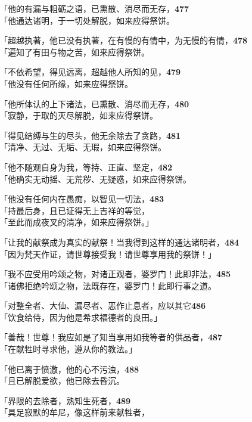 「他的有漏与粗砺之语，已熏散、消尽而无存，\hfill{\grayfootnotesize \textbf{477}} \\
「他通达诸明，于一切处解脱，如来应得祭饼。


「超越执著，他已没有执著，在有慢的有情中，为无慢的有情，\hfill{\grayfootnotesize \textbf{478}} \\
「遍知了有田与物之苦，如来应得祭饼。


「不依希望，得见远离，超越他人所知的见，\hfill{\grayfootnotesize \textbf{479}} \\
「他没有任何所缘，如来应得祭饼。


「他所体认的上下诸法，已熏散、消尽而无存，\hfill{\grayfootnotesize \textbf{480}} \\
「寂静，于取的灭尽解脱，如来应得祭饼。


「得见结缚与生的尽头，他无余除去了贪路，\hfill{\grayfootnotesize \textbf{481}} \\
「清净、无过、无垢、无瑕，如来应得祭饼。


「他不随观自身为我，等持、正直、坚定，\hfill{\grayfootnotesize \textbf{482}} \\
「他确实无动摇、无荒秽、无疑惑，如来应得祭饼。


「他没有任何内在愚痴，以智见一切法，\hfill{\grayfootnotesize \textbf{483}} \\
「持最后身，且已证得无上吉祥的等觉，\\
「至此而成夜叉的清净，如来应得祭饼。」


「让我的献祭成为真实的献祭！当我得到这样的通达诸明者，\hfill{\grayfootnotesize \textbf{484}} \\
「因为梵天作证，请世尊接受我！请世尊享用我的祭饼！」


「我不应受用吟颂之物，对诸正观者，婆罗门！此即非法，\hfill{\grayfootnotesize \textbf{485}} \\
「诸佛拒绝吟颂之物，法既存在，婆罗门！此即行事之道。


「对整全者、大仙、漏尽者、恶作止息者，应以其它\hfill{\grayfootnotesize \textbf{486}} \\
「饮食给侍，因为他是希求福德者的良田。」

「善哉！世尊！我应如是了知当享用如我等者的供品者，\hfill{\grayfootnotesize \textbf{487}} \\
「在献牲时寻求他，遵从你的教法。」


「他已离于愤激，他的心不污浊，\hfill{\grayfootnotesize \textbf{488}} \\
「且已解脱爱欲，他已除去昏沉。


「界限的去除者，熟知生死者，\hfill{\grayfootnotesize \textbf{489}} \\
「具足寂默的牟尼，像这样前来献牲者，


